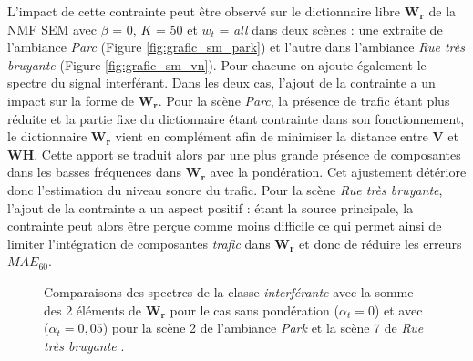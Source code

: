 L'impact de cette contrainte peut être observé sur le dictionnaire libre $\mathbf{W_r}$ de la NMF SEM avec $\beta$ = 0, $K$ = 50 et $w_t$ = \textit{all} dans deux scènes : une extraite de l'ambiance \textit{Parc} (Figure \ref{fig:grafic_sm_park}) et l'autre dans l'ambiance \textit{Rue très bruyante} (Figure \ref{fig:grafic_sm_vn}). Pour chacune on ajoute également le spectre du signal interférant. Dans les deux cas, l'ajout de la contrainte a un impact sur la forme de $\mathbf{W_r}$. Pour la scène \textit{Parc}, la présence de trafic étant plus réduite et la partie fixe du dictionnaire étant contrainte dans son fonctionnement, le dictionnaire $\mathbf{W_r}$ vient en complément afin de minimiser la distance entre $\mathbf{V}$ et $\mathbf{WH}$. Cette apport se traduit alors par une plus grande présence de composantes dans les basses fréquences dans $\mathbf{W_r}$ avec la pondération. Cet ajustement détériore donc l'estimation du niveau sonore du trafic. Pour la scène \textit{Rue très bruyante}, l'ajout de la contrainte a un aspect positif : étant la source principale, la contrainte peut alors être perçue comme moins \og difficile \fg{} ce qui permet ainsi de limiter l'intégration de composantes \textit{trafic} dans $\mathbf{W_r}$ et donc de réduire les erreurs $MAE_{60}$.

\begin{figure}[h!]
\centering
{}%
\qquad
{}%
\caption{Comparaisons des spectres de la classe \textit{interférante} avec la somme des 2 éléments de $\mathbf{W_r}$ pour le cas sans pondération ($\alpha_{t}= 0$) et avec ($\alpha_t = 0,05$) pour la scène 2 de l'ambiance \textit{Park}  et la scène 7 de \textit{Rue très bruyante} .}
\label{fig:grafic_sm}
\end{figure}

